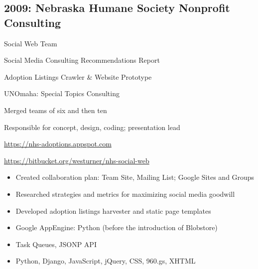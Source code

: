 \documentclass[letter,,openany,oneside]{sphinxhowto}
\begin{document}
\subsection{2009: Nebraska Humane Society Nonprofit Consulting}
\label{resume:id2}
\begin{DUlineblock}{0em}
\item[] Social Web Team
\item[] Social Media Consulting Recommendations Report
\item[] Adoption Listings Crawler \& Website Prototype
\item[] UNOmaha: Special Topics Consulting
\item[] Merged teams of six and then ten
\item[] Responsible for concept, design, coding; presentation lead
\item[] \href{https://nhs-adoptions.appspot.com}{https://nhs-adoptions.appspot.com}
\item[] \href{https://bitbucket.org/westurner/nhs-social-web}{https://bitbucket.org/westurner/nhs-social-web}
\end{DUlineblock}
\begin{itemize}
\item {} 
Created collaboration plan: Team Site, Mailing List; Google Sites and Groups

\item {} 
Researched strategies and metrics for maximizing social media goodwill

\item {} 
Developed adoption listings harvester and static page templates

\item {} 
Google AppEngine: Python (before the introduction of Blobstore)

\item {} 
Task Queues, JSONP API

\item {} 
Python, Django, JavaScript, jQuery, CSS, 960.gs, XHTML

\end{itemize}
\end{document}
